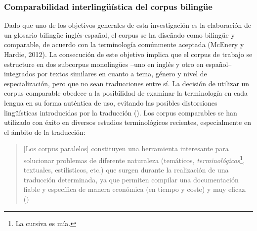 \subsubsection{Comparabilidad interlingüística del corpus bilingüe}
Dado que uno de los objetivos generales de esta investigación es la elaboración de un glosario bilingüe inglés-español, el corpus se ha diseñado como bilingüe y comparable, de acuerdo con la terminología comúnmente aceptada (McEnery y Hardie, 2012). La consecución de este objetivo implica que el corpus de trabajo se estructure en dos subcorpus monolingües –uno en inglés y otro en español– integrados por textos similares en cuanto a tema, género y nivel de especialización, pero que no sean traducciones entre sí. La decisión de utilizar un corpus comparable obedece a la posibilidad de  examinar la terminología en cada lengua en su forma auténtica de uso, evitando las posibles distorsiones lingüísticas introducidas por la traducción (\cite{negrillo2010corpus,duran2011trabajo,hourani2017unidades}). Los corpus comparables se han utilizado con éxito en diversos estudios terminológicos recientes, especialmente en el ámbito de la traducción:

\begin{quote}
    [Los corpus paralelos] constituyen una herramienta interesante para solucionar problemas de diferente naturaleza (temáticos, \textit{terminológicos}\footnote{La cursiva es mía.}, textuales, estilísticos, etc.) que surgen durante la realización de una traducción determinada, ya que permiten compilar una documentación fiable y específica de manera económica (en tiempo y coste) y muy eficaz. (\cite{sancheztrigo2005})
\end{quote}

